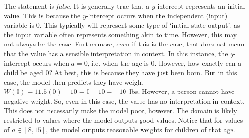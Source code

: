 \documentclass[11pt,letterpaper]{article}
\begin{document}
\sol The statement is \textit{false}. It is generally true that a $y$-intercept represents an initial value. This is because the $y$-intercept occurs when the independent (input) variable is $0$. This typically will represent some type of `initial state output', as the input variable often represents something akin to time. However, this may not always be the case. Furthermore,  even if this is the case, that does not mean that the value has a sensible interpretation in context. In this instance, the $y$-intercept occurs when $a= 0$, i.e. when the age is $0$. However, how exactly can a child be aged $0$? At best, this is because they have just been born. But in this case, the model then predicts they have weight $W(0)= 11.5(0) - 10= 0 - 10= -10$~lbs. However, a person cannot have negative weight. So, even in this case, the value has no interpretation in context. This does not necessarily make the model poor, however. The domain is likely restricted to values where the model outputs good values. Notice that for values of $a \in [8, 15]$, the model outputs reasonable weights for children of that age. \par\vspace{1.3cm}



\newpage
\end{document}
